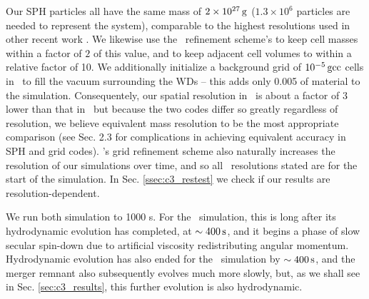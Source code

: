 Our SPH particles all have the same mass of $2\times10^{27}\,\mathrm{g}$ ($1.3\times10^{6}$ particles are needed to represent the system), comparable to the highest resolutions used in other recent work \citep{pakm+12, rask+14}.  We likewise use the \arepo\ refinement scheme's to keep cell masses within a factor of $2$ of this value, and to keep adjacent cell volumes to within a relative factor of 10.  We additionally initialize a background grid of $10^{-5}\,\mathrm{gcc}$ cells in \arepo\ to fill the vacuum surrounding the WDs -- this adds only 0.005 {\Msun} of material to the simulation.  Consequentely, our spatial resolution in \gasoline\ is about a factor of {\charles $3$} lower than that in \arepo\, but because the two codes differ so greatly regardless of resolution, we believe equivalent mass resolution to be the most appropriate comparison (see \citeauthor{voge+12} Sec. 2.3 for complications in achieving equivalent accuracy in SPH and grid codes).  \arepo's grid refinement scheme also naturally increases the resolution of our simulations over time, and so all \arepo\ resolutions stated are for the start of the simulation.  In Sec. \ref{ssec:c3_restest} we check if our results are resolution-dependent.

We run both simulation to 1000 s.  For the \gasoline\ simulation, this is long after its hydrodynamic evolution has completed, at $\sim400\,\mathrm{s}$, and it begins a phase of slow secular spin-down due to artificial viscosity redistributing angular momentum.  Hydrodynamic evolution has also ended for the \arepo\ simulation by $\sim400\,\mathrm{s}$, and the merger remnant also subsequently evolves much more slowly, but, as we shall see in Sec. \ref{sec:c3_results}, this further evolution is also hydrodynamic.


